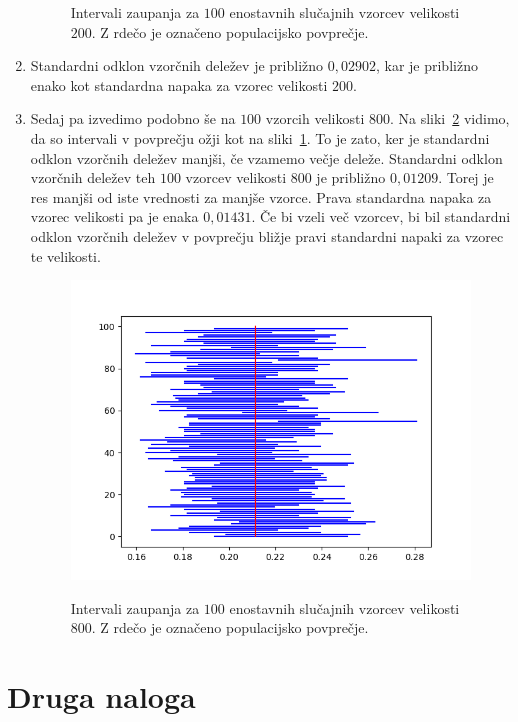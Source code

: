 \documentclass{article}
\begin{document}
\begin{enumerate}[label=\alph*)]
\begin{figure}[H]
            \label{slika 1d}
            \caption{Intervali zaupanja za $100$ enostavnih slučajnih vzorcev
            velikosti $200$. Z rdečo je označeno populacijsko povprečje.}
        \end{figure}
    \item Standardni odklon vzorčnih deležev je približno $0{,}02902$, kar je
        približno enako kot standardna napaka za vzorec velikosti $200$.
    \item Sedaj pa izvedimo podobno še na $100$ vzorcih velikosti $800$. Na
        sliki~\ref{slika 1f} vidimo, da so intervali v povprečju ožji kot na
        sliki~\ref{slika 1d}. To je zato, ker je standardni odklon vzorčnih
        deležev manjši, če vzamemo večje deleže. Standardni odklon vzorčnih
        deležev teh $100$ vzorcev velikosti $800$ je približno $0{,}01209$.
        Torej je res manjši od iste vrednosti za manjše vzorce. Prava standardna
        napaka za vzorec velikosti pa je enaka $0{,}01431$. Če bi vzeli več
        vzorcev, bi bil standardni odklon vzorčnih deležev v povprečju bližje
        pravi standardni napaki za vzorec te velikosti.
        \begin{figure}[H]
            \centering
            \includegraphics[scale=0.5]{1f.png}
            \label{slika 1f}
            \caption{Intervali zaupanja za $100$ enostavnih slučajnih vzorcev
            velikosti $800$. Z rdečo je označeno populacijsko povprečje.}
        \end{figure}
\end{enumerate}

\section{Druga naloga}
\end{document}
